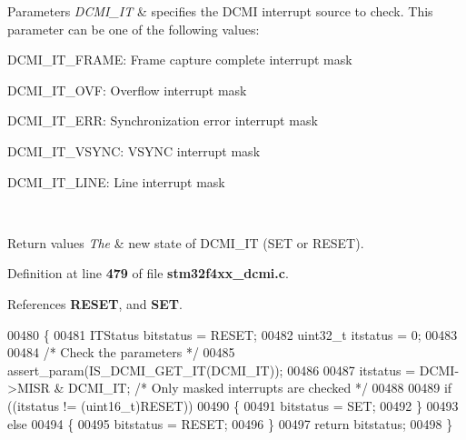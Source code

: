 \begin{DoxyParams}{Parameters}
{\em D\+C\+M\+I\+\_\+\+IT} & specifies the D\+C\+MI interrupt source to check. This parameter can be one of the following values\+: \begin{DoxyItemize}
\item D\+C\+M\+I\+\_\+\+I\+T\+\_\+\+F\+R\+A\+ME\+: Frame capture complete interrupt mask \item D\+C\+M\+I\+\_\+\+I\+T\+\_\+\+O\+VF\+: Overflow interrupt mask \item D\+C\+M\+I\+\_\+\+I\+T\+\_\+\+E\+RR\+: Synchronization error interrupt mask \item D\+C\+M\+I\+\_\+\+I\+T\+\_\+\+V\+S\+Y\+NC\+: V\+S\+Y\+NC interrupt mask \item D\+C\+M\+I\+\_\+\+I\+T\+\_\+\+L\+I\+NE\+: Line interrupt mask \end{DoxyItemize}
\\
\hline
\end{DoxyParams}

\begin{DoxyRetVals}{Return values}
{\em The} & new state of D\+C\+M\+I\+\_\+\+IT (S\+ET or R\+E\+S\+ET). \\
\hline
\end{DoxyRetVals}


Definition at line \textbf{ 479} of file \textbf{ stm32f4xx\+\_\+dcmi.\+c}.



References \textbf{ R\+E\+S\+ET}, and \textbf{ S\+ET}.


\begin{DoxyCode}
00480 \{
00481   ITStatus bitstatus = RESET;
00482   uint32\_t itstatus = 0;
00483   
00484   \textcolor{comment}{/* Check the parameters */}
00485   assert_param(IS_DCMI_GET_IT(DCMI\_IT));
00486   
00487   itstatus = DCMI->MISR & DCMI\_IT; \textcolor{comment}{/* Only masked interrupts are checked */}
00488   
00489   \textcolor{keywordflow}{if} ((itstatus != (uint16\_t)RESET))
00490   \{
00491     bitstatus = SET;
00492   \}
00493   \textcolor{keywordflow}{else}
00494   \{
00495     bitstatus = RESET;
00496   \}
00497   \textcolor{keywordflow}{return} bitstatus;
00498 \}
\end{DoxyCode}
\mbox{\label{group__DCMI__Group3_ga3d89fb10384dff1dfd9197fbb6c6b2eb}} 
